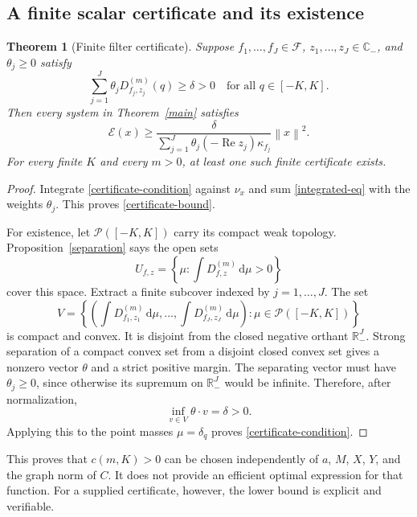 \documentclass[11pt,a4paper]{article}
\newtheorem{theorem}{Theorem}[section]
\theoremstyle{definition}\newtheorem{definition}[theorem]{Definition}
\theoremstyle{remark}\newtheorem{remark}[theorem]{Remark}
\newcommand{\C}{\mathbb C}\newcommand{\R}{\mathbb R}\newcommand{\N}{\mathbb N}
\newcommand{\E}{\mathcal E}\newcommand{\D}{\mathcal D}
\newcommand{\F}{\mathcal F}\newcommand{\Prob}{\mathcal P}
\newcommand{\dd}{\,\mathrm d}
\DeclareMathOperator{\Rea}{Re}\DeclareMathOperator{\Ima}{Im}
\newcommand{\norm}[1]{\left\lVert #1\right\rVert}
\begin{document}
\subsection{A finite scalar certificate and its existence}
\begin{theorem}[Finite filter certificate]\label{certificate}
Suppose $f_1,\dots,f_J\in\F$, $z_1,\dots,z_J\in\C_-$, and $\theta_j\ge0$ satisfy
\begin{equation}\label{certificate-condition}
 \sum_{j=1}^J\theta_jD_{f_j,z_j}^{(m)}(q)\ge\delta>0
 \quad\text{for all }q\in[-K,K].
\end{equation}
Then every system in Theorem~\ref{main} satisfies
\begin{equation}\label{certificate-bound}
 \E(x)\ge
 \frac{\delta}{\sum_{j=1}^J\theta_j(-\Rea z_j)\kappa_{f_j}}\norm{x}^2.
\end{equation}
For every finite $K$ and every $m>0$, at least one such finite certificate exists.
\end{theorem}
\begin{proof}
Integrate \eqref{certificate-condition} against $\nu_x$ and sum \eqref{integrated-eq} with the weights $\theta_j$. This proves \eqref{certificate-bound}.

For existence, let $\Prob([-K,K])$ carry its compact weak topology. Proposition~\ref{separation} says the open sets
\[
 U_{f,z}=\left\{\mu:\int D_{f,z}^{(m)}\dd\mu>0\right\}
\]
cover this space. Extract a finite subcover indexed by $j=1,\dots,J$. The set
\[
 V=\left\{\left(\int D_{f_1,z_1}^{(m)}\dd\mu,\ldots,
 \int D_{f_J,z_J}^{(m)}\dd\mu\right):\mu\in\Prob([-K,K])\right\}
\]
is compact and convex. It is disjoint from the closed negative orthant $\R_-^J$. Strong separation of a compact convex set from a disjoint closed convex set gives a nonzero vector $\theta$ and a strict positive margin. The separating vector must have $\theta_j\ge0$, since otherwise its supremum on $\R_-^J$ would be infinite. Therefore, after normalization,
\[
 \inf_{v\in V}\theta\cdot v=\delta>0.
\]
Applying this to the point masses $\mu=\delta_q$ proves \eqref{certificate-condition}.
\end{proof}
This proves that $c(m,K)>0$ can be chosen independently of $a$, $M$, $X$, $Y$, and the graph norm of $C$. It does not provide an efficient optimal expression for that function. For a supplied certificate, however, the lower bound is explicit and verifiable.
\end{document}
